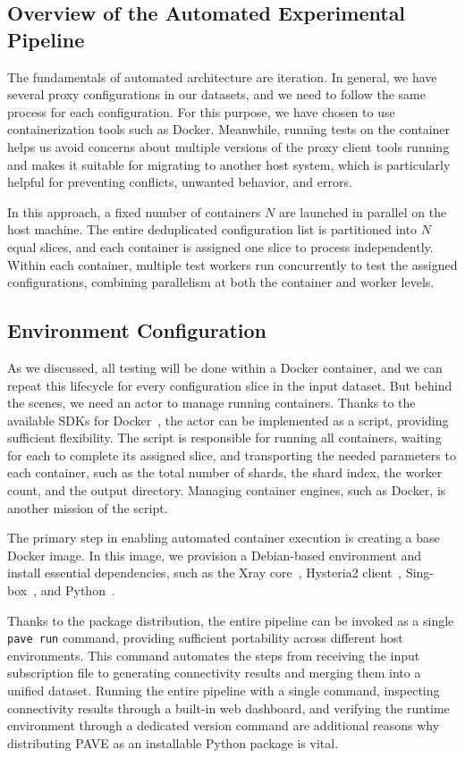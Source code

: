 \documentclass[10pt,conference]{IEEEtran}
\begin{document}
\subsection{Overview of the Automated Experimental Pipeline}
The fundamentals of automated architecture are iteration.
In general, we have several proxy configurations in our datasets, and we need to follow the same process for each configuration.
For this purpose, we have chosen to use containerization tools such as Docker.
Meanwhile, running tests on the container helps us avoid concerns about multiple versions of the proxy client tools running and makes it suitable for migrating to another host system, which is particularly helpful for preventing conflicts, unwanted behavior, and errors.

In this approach, a fixed number of containers $N$ are launched in parallel on the host machine.
The entire deduplicated configuration list is partitioned into $N$ equal slices, and each container is assigned one slice to process independently.
Within each container, multiple test workers run concurrently to test the assigned configurations, combining parallelism at both the container and worker levels.

\subsection{Environment Configuration}
As we discussed, all testing will be done within a Docker container, and we can repeat this lifecycle for every configuration slice in the input dataset.
But behind the scenes, we need an actor to manage running containers.
Thanks to the available SDKs for Docker~\cite{docker}, the actor can be implemented as a script, providing sufficient flexibility.
The script is responsible for running all containers, waiting for each to complete its assigned slice, and transporting the needed parameters to each container, such as the total number of shards, the shard index, the worker count, and the output directory.
Managing container engines, such as Docker, is another mission of the script.

The primary step in enabling automated container execution is creating a base Docker image.
In this image, we provision a Debian-based environment and install essential dependencies, such as the Xray core~\cite{xray_core}, Hysteria2 client~\cite{hysteria2_proto}, Sing-box~\cite{singbox}, and Python~\cite{python_org}.

Thanks to the package distribution, the entire pipeline can be invoked as a single \texttt{pave run} command, providing sufficient portability across different host environments.
This command automates the steps from receiving the input subscription file to generating connectivity results and merging them into a unified dataset.
Running the entire pipeline with a single command, inspecting connectivity results through a built-in web dashboard, and verifying the runtime environment through a dedicated version command are additional reasons why distributing PAVE as an installable Python package is vital.
\end{document}
